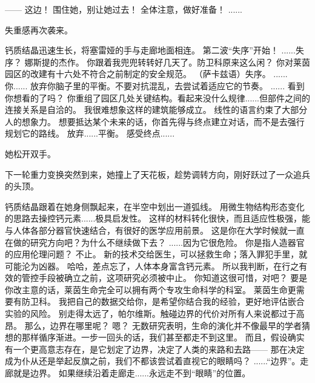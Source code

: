 \documentclass[openany]{book}
\begin{document}
\begin{dialogue}
     ——
     这边！
     围住她，别让她过去！
     全体注意，做好准备！
     ......\par
    失重感再次袭来。\par
    钙质结晶迅速生长，将塞雷娅的手与走廊地面相连。
     第二波“失序”开始！
     ......失序？
     娜斯提的杰作。
     你跟着我兜兜转转好几天了。防卫科原来这么闲？
     你对莱茵园区的改建有十六处不符合之前制定的安全规范。
     （萨卡兹语）失序。
     ......
     你......
     放弃你脑子里的平衡。不要对抗混乱，去尝试着适应它的节奏。
     ......
     看到你想看的了吗？
     你重组了园区几处关键结构。看起来没什么规律......但部件之间的连接关系是自洽的。
     我很难想象这样的建筑能够成立。
     线性的语言约束了大部分人的想象力。
     想要抵达某个未来的话，你首先得与终点建立对话，而不是去强行规划它的路线。
     放弃......平衡。
     感受终点......\par
    她松开双手。\par
    下一轮重力变换突然到来，她撞上了天花板，趁势调转方向，刚好跃过了一众追兵的头顶。\par
    钙质结晶跟着在她身侧飘起来，在半空中划出一道弧线。
     用微生物结构形态变化的思路去操控钙元素......极具启发性。
     这样的材料转化很快，而且适应性极强，能与人体各部分器官快速结合，有很好的医学应用前景。
     这是你在大学时候就一直在做的研究方向吧？为什么不继续做下去？
     ......因为它很危险。
     你是指人造器官的应用伦理问题？
     不止。
     新的技术交给医生，可以拯救生命；落入罪犯手里，就可能沦为凶器。
     哈哈，差点忘了，人体本身富含钙元素。
     所以我判断，在行之有效的管控手段被确立之前，这项研究必须被中止。
     你知道这很可惜，对吧？
     要是你改主意的话，莱茵生命完全可以拥有两个专攻生命科学的科室。
     莱茵生命更需要有防卫科。
     我把自己的数据交给你，是希望你结合我的经验，更好地评估嵌合实验的风险。
     别走得太远了，帕尔维斯。触碰边界的代价对所有人来说都过于高昂。
     那么，边界在哪里呢？
     嗯？
     无数研究表明，生命的演化并不像最早的学者猜想的那样循序渐进。一步一回头的话，我们甚至都走不到这里。
     而且，假设确实有一个更高意志存在，是它划定了边界，决定了人类的来路和去路——
     那在决定成为仆从还是举起反旗之前，我们不都该尝试着直视它的眼睛吗？
     ......“边界”。走廊就是边界。
     如果继续沿着走廊走......永远走不到“眼睛”的位置。
\end{dialogue}\par
\end{document}
